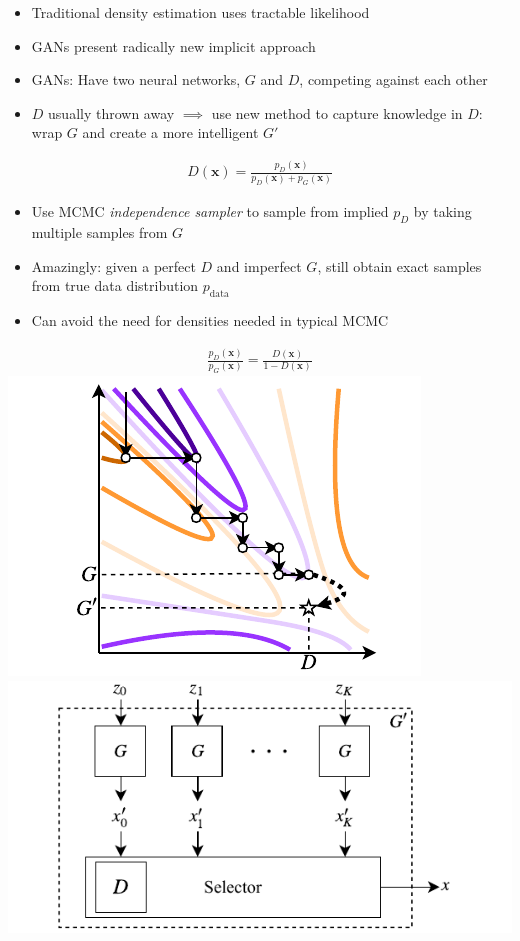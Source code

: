\documentclass[a0,landscape]{a0poster}
\renewcommand{\vec}[1]{{\boldsymbol{\mathbf{#1}}}} %
\newcommand{\PG}{{p_G}}
\newcommand{\PD}{{p_D}}
\newcommand{\PR}{{p_{\textrm{data}}}}
\begin{document}
\begin{multicols}{3}
\begin{itemize}
  \item Traditional density estimation uses tractable likelihood
  \item GANs present radically new implicit approach
  \item GANs: Have two neural networks, $G$ and $D$, competing against each other
  \item $D$ usually thrown away $\implies$ use new method to capture knowledge in $D$: wrap $G$ and create a more intelligent $G'$
\end{itemize}
%
\begin{align}
  D(\vec x) = \frac{\PD(\vec x)}{\PD(\vec x) + \PG(\vec x)}
\end{align}
%
\begin{itemize}
  \item Use MCMC \emph{independence sampler} to sample from implied $\PD$ by taking multiple samples from $G$
  \item Amazingly: given a perfect $D$ and imperfect $G$, still obtain exact samples from true data distribution $\PR$
  \item Can avoid the need for densities needed in typical MCMC
\end{itemize}
%
\begin{align}
  \frac{\PD(\vec x)}{\PG(\vec x)} = \frac{D(\vec x)}{1 - D(\vec x)}
\end{align}
%
\includegraphics[scale=2.5]{../figures/coord_descent.pdf}
\includegraphics[scale=2.5]{../figures/block_diag.pdf}


\end{multicols}
\end{document}
